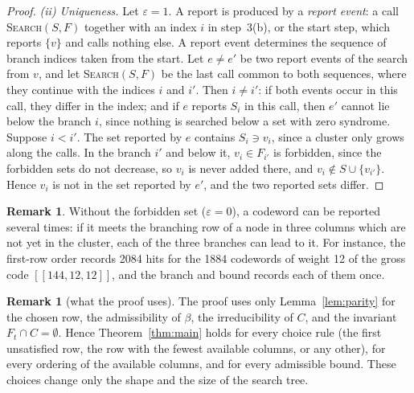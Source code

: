 \documentclass[11pt]{article}
\theoremstyle{definition}
\newtheorem{remark}[theorem]{Remark}
\begin{document}
\begin{proof}
\emph{(ii) Uniqueness.} Let $\varepsilon=1$. A report is produced by a \emph{report event}: a call
\textup{\textsc{Search}}$(S,F)$ together with an index $i$ in step~3(b), or the start step, which reports $\{v\}$
and calls nothing else. A report event determines the sequence of branch indices taken from the start. Let
$e\neq e'$ be two report events of the search from $v$, and let \textup{\textsc{Search}}$(S,F)$ be the last call
common to both sequences, where they continue with the indices $i$ and $i'$. Then $i\neq i'$: if both events occur in
this call, they differ in the index; and if $e$ reports $S_i$ in this call, then $e'$ cannot lie below the branch $i$,
since nothing is searched below a set with zero syndrome. Suppose $i<i'$. The set reported by $e$ contains
$S_i\ni v_i$, since a cluster only grows along the calls. In the branch $i'$ and below it, $v_i\in F_{i'}$ is
forbidden, since the forbidden sets do not decrease, so $v_i$ is never added there, and $v_i\notin S\cup\{v_{i'}\}$.
Hence $v_i$ is not in the set reported by $e'$, and the two reported sets differ.
\end{proof}

\begin{remark}\label{rem:mult}
Without the forbidden set ($\varepsilon=0$), a codeword can be reported several times: if it meets the branching row
of a node in three columns which are not yet in the cluster, each of the three branches can lead to it. For instance,
the first-row order records 2084 hits for the 1884 codewords of weight 12 of the gross code $[[144,12,12]]$, and the
branch and bound records each of them once.
\end{remark}

\begin{remark}[what the proof uses]\label{rem:uses}
The proof uses only Lemma~\ref{lem:parity} for the chosen row, the admissibility of $\beta$, the irreducibility of
$C$, and the invariant $F_t\cap C=\emptyset$. Hence Theorem~\ref{thm:main} holds for every choice rule (the first
unsatisfied row, the row with the fewest available columns, or any other), for every ordering of the available
columns, and for every admissible bound. These choices change only the shape and the size of the search tree.
\end{remark}
\end{document}
